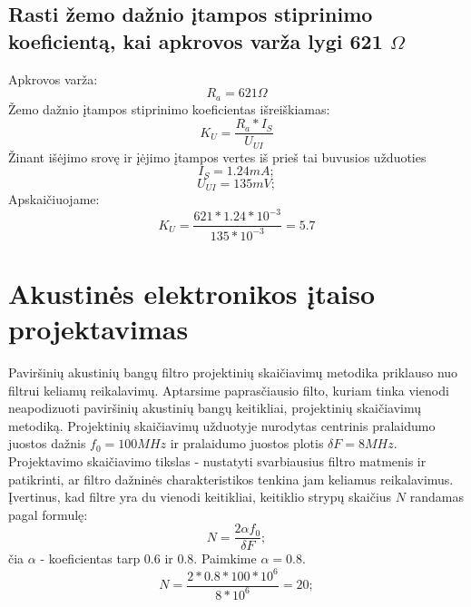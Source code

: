 \documentclass[11pt,a4paper]{article}
\begin{document}
\subsection{Rasti žemo dažnio įtampos stiprinimo koeficientą, kai apkrovos varža lygi 621 $\Omega$}

Apkrovos varža:
\[
R_a = 621 \Omega
\]
Žemo dažnio įtampos stiprinimo koeficientas išreiškiamas:
\begin{equation}
	K_U = \frac{R_a * I_S}{U_{UI}}
\end{equation}
Žinant išėjimo srovę ir įėjimo įtampos vertes iš prieš tai buvusios užduoties
\[
I_S = 1.24 mA;
\]
\[
U_{UI} = 135 mV;
\]
Apskaičiuojame:
\[
	K_U = \frac{621 * 1.24*10^{-3}}{135 *10^{-3}} = 5.7
\]

\section{Akustinės elektronikos įtaiso projektavimas}
Paviršinių akustinių bangų filtro projektinių skaičiavimų metodika priklauso nuo filtrui keliamų reikalavimų. 
Aptarsime paprasčiausio filto, kuriam tinka vienodi neapodizuoti paviršinių akustinių bangų keitikliai, 
projektinių skaičiavimų metodiką. Projektinių skaičiavimų užduotyje nurodytas centrinis pralaidumo 
juostos dažnis $f_{0} = 100 MHz$ ir pralaidumo juostos plotis $\delta F = 8MHz$. Projektavimo skaičiavimo 
tikslas - nustatyti svarbiausius filtro matmenis ir patikrinti, ar filtro dažninės charakteristikos 
tenkina jam keliamus reikalavimus.
Įvertinus, kad filtre yra du vienodi keitikliai, keitiklio strypų skaičius $N$ randamas pagal formulę:
\begin{equation}
	N = \frac { 2 \alpha f_{0}  }{\delta F};
\end{equation}
čia $\alpha$ - koeficientas tarp 0.6 ir 0.8. Paimkime $\alpha = 0.8$.
\[
	N = \frac{ 2 * 0.8 * 100*10^{6} }{8*10^{6}} = 20;
\]
\end{document}
